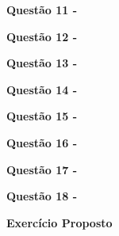         \vspace{0.5cm}\textbf{Questão 11 -}
        
        
        
        \vspace{0.5cm}\textbf{Questão 12 -}
        
        
        
        \vspace{0.5cm}\textbf{Questão 13 -}
        
        
        
        \vspace{0.5cm}\textbf{Questão 14 -}
        
        
        
        \vspace{0.5cm}\textbf{Questão 15 -}
        
        
        
        \vspace{0.5cm}\textbf{Questão 16 -}
        
        
        
        \vspace{0.5cm}\textbf{Questão 17 -}
        
        
        
        \vspace{0.5cm}\textbf{Questão 18 -}
        
        
        \textbf{Exercício Proposto}